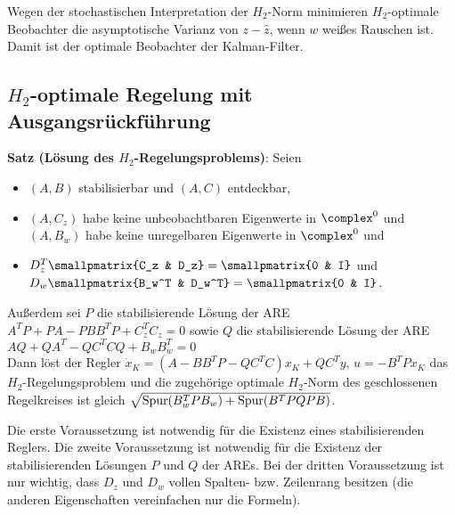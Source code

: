Wegen der stochastischen Interpretation der $H_2$-Norm minimieren
$H_2$-optimale Beobachter die asymptotische Varianz von $z - \widehat{z}$,
wenn $w$ weißes Rauschen ist.
Damit ist der optimale Beobachter der Kalman-Filter.

\subsection{%
    \texorpdfstring{$H_2$-optimale}{H₂-optimale} Regelung mit Ausgangsrückführung%
}

\textbf{Satz (Lösung des $H_2$-Regelungsproblems)}:
Seien
\begin{itemize}
    \item
    $(A, B)$ stabilisierbar und $(A, C)$ entdeckbar,

    \item
    $(A, C_z)$ habe keine unbeobachtbaren Eigenwerte in $\complex^0$ und\\
    $(A, B_w)$ habe keine unregelbaren Eigenwerte in $\complex^0$ und

    \item
    $D_z^T \smallpmatrix{C_z & D_z} = \smallpmatrix{0 & I}$ und
    $D_w \smallpmatrix{B_w^T & D_w^T} = \smallpmatrix{0 & I}$.
\end{itemize}
Außerdem sei $P$ die stabilisierende Lösung der ARE $A^T P + PA - PBB^T P + C_z^T C_z = 0$
sowie $Q$ die stabilisierende Lösung der ARE $AQ + QA^T - QC^T CQ + B_w B_w^T = 0$\\
Dann löst der Regler
$\dot{x}_K = (A - BB^T P - QC^T C) x_K + QC^T y$, $u = -B^T P x_K$
das $H_2$-Regelungsproblem und die zugehörige optimale $H_2$-Norm des geschlossenen Regelkreises
ist gleich
$\sqrt{\operatorname{Spur}(B_w^T P B_w) + \operatorname{Spur}(B^T PQPB)}$.

Die erste Voraussetzung ist notwendig für die Existenz eines stabilisierenden Reglers.
Die zweite Voraussetzung ist notwendig für die Existenz der stabilisierenden Lösungen $P$ und $Q$
der AREs.
Bei der dritten Voraussetzung ist nur wichtig, dass $D_z$ und $D_w$ vollen Spalten- bzw.
Zeilenrang besitzen (die anderen Eigenschaften vereinfachen nur die Formeln).

\pagebreak

